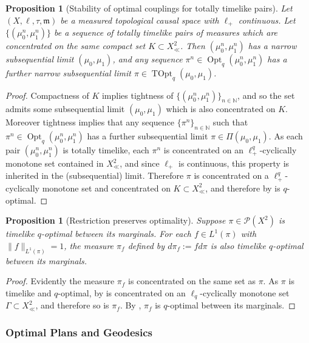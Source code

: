 \documentclass{article}
\newcommand{\N}{\mathbb{N}}
\newcommand{\m}{\mathfrak{m}}
\newcommand{\Pcal}{\mathcal{P}}
\DeclareMathOperator{\Opt}{Opt}
\DeclareMathOperator{\TOpt}{TOpt}
\newtheorem{prop}[theorem]{Proposition}
\theoremstyle{definition}
\begin{document}
{\begin{prop}[Stability of optimal couplings for totally timelike pairs]\label{Stableopt}
Let $(X,\ell,\tau, \m)$ be a measured topological causal space with $\ell_+$ continuous. Let $\{(\mu^n_0, \mu^n_1)\}$ be a sequence of totally timelike pairs of measures which are concentrated on the same compact set $K\subset X_\ll^2$.  Then $(\mu^n_0, \mu^n_1)$ has a narrow subsequential limit $(\mu_0, \mu_1)$, and any sequence $\pi^n\in \Opt_q(\mu_0^n, \mu_1^n)$ has a further narrow subsequential limit $\pi \in \TOpt_q(\mu_0, \mu_1)$. 
\end{prop}
\begin{proof}
Compactness of $K$ implies tightness of $\{(\mu_0^n, \mu_1^n)\}_{n\in \N}$,  and so the set admits some subsequential limit $(\mu_0, \mu_1)$ which is also concentrated on $K$. Moreover tightness implies that any sequence $\{\pi^n\}_{n\in\N}$ such that $\pi^n\in \Opt_q(\mu_0^n, \mu_1^n)$ has a further subsequential limit $\pi\in \Pi(\mu_0,\mu_1)$. As each pair $(\mu_0^n, \mu_1^n)$ is totally timelike, each $\pi^n$ is concentrated on an $\ell_+^q$-cyclically monotone set contained in $X_\ll^2$, and since $\ell_+$ is continuous, this property is inherited in the (subsequential) limit. Therefore $\pi$ is concentrated on a $\ell_+^q$-cyclically monotone set and concentrated on $K\subset X_\ll^2$, and therefore by  is $q$-optimal. 
\end{proof}

\begin{prop}[Restriction preserves optimality]
Suppose $\pi\in\Pcal(X^2)$ is timelike $q$-optimal between its marginals. For each $f\in L^1(\pi)$ with $ \|f\|_{L^1(\pi)}=1$, the measure $\pi_f$ defined by $d\pi_f:=fd\pi$ is also timelike $q$-optimal between its marginals. 
\end{prop}
\begin{proof}
Evidently the measure $\pi_f$ is concentrated on the same set as $\pi$. As $\pi$ is timelike and $q$-optimal, by  is concentrated on an $\ell_q$-cyclically monotone set $\Gamma\subset X_\ll^2$, and therefore so is $\pi_f$. By , $\pi_f$ is $q$-optimal between its marginals. 
\end{proof}



\subsubsection{Optimal Plans and Geodesics}

}
\end{document}
